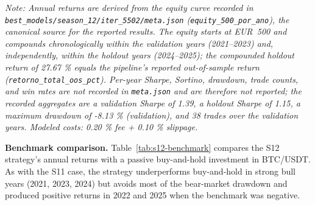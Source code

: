 \documentclass[analytics,article,submit,pdftex,moreauthors]{Definitions/mdpi}
\begin{document}
\emph{Note: Annual returns are derived from the equity curve recorded in \texttt{best\_models/season\_12/iter\_5502/meta.json} (\texttt{equity\_500\_por\_ano}), the canonical source for the reported results. The equity starts at EUR~500 and compounds chronologically within the validation years (2021--2023) and, independently, within the holdout years (2024--2025); the compounded holdout return of 27.67 \% equals the pipeline's reported out-of-sample return (\texttt{retorno\_total\_oos\_pct}). Per-year Sharpe, Sortino, drawdown, trade counts, and win rates are not recorded in \texttt{meta.json} and are therefore not reported; the recorded aggregates are a validation Sharpe of 1.39, a holdout Sharpe of 1.15, a maximum drawdown of -8.13 \% (validation), and 38 trades over the validation years. Modeled costs: 0.20 \% fee + 0.10 \% slippage.}

\textbf{Benchmark comparison.} Table~\ref{tab:s12-benchmark} compares the S12 strategy's annual returns with a passive buy-and-hold investment in BTC/USDT. As with the S11 case, the strategy underperforms buy-and-hold in strong bull years (2021, 2023, 2024) but avoids most of the bear-market drawdown and produced positive returns in 2022 and 2025 when the benchmark was negative.
\end{document}
